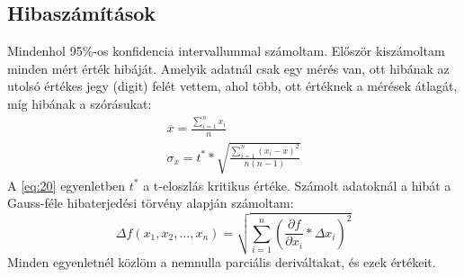 \documentclass[twoside]{article}
\begin{document}
	\subsection{Hibaszámítások}
		Mindenhol 95\%-os konfidencia intervallummal számoltam. Először kiszámoltam minden mért érték hibáját. Amelyik adatnál csak egy mérés van, ott hibának az utolsó értékes jegy (digit) felét vettem, ahol több, ott értéknek a mérések átlagát, míg hibának a szórásukat:
		\begin{gather}
			\overline{x}=\frac{\sum_{i=1}^{n} x_i}{n}\label{eq:19}\\
			\sigma_x=t^**\sqrt{\frac{\sum_{i=1}^{n} (x_i-\overline{x})^2}{n(n-1)}}\label{eq:20}
		\end{gather}
		A \eqref{eq:20} egyenletben $t^*$ a t-eloszlás kritikus értéke. Számolt adatoknál a hibát a Gauss-féle hibaterjedési törvény alapján számoltam:
		\begin{equation}
			\Delta f(x_1,x_2,...,x_n)=\sqrt{\sum_{i=1}^{n}\left(\frac{\partial f}
			{\partial x_i}*\Delta x_i\right)^2}\label{eq:21}
		\end{equation}
		Minden egyenletnél közlöm a nemnulla parciális deriváltakat, és ezek értékeit.
\end{document}
